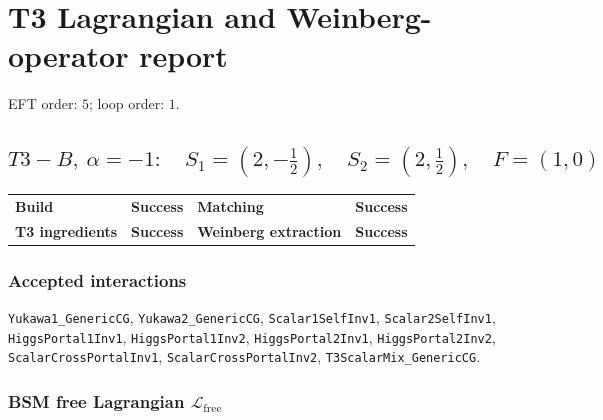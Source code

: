 \documentclass[10pt]{article}
\begin{document}
\section*{T3 Lagrangian and Weinberg-operator report}
EFT order: $5$; loop order: $1$.
\subsection*{$T3-B,\ \alpha=-1:\quad S_1=(2,-\frac{1}{2}),\quad S_2=(2,\frac{1}{2}),\quad F=(1,0)$}
\begin{center}
\begin{tabular}{>{\bfseries}l l >{\bfseries}l l}
\toprule
Build & \textbf{Success} & Matching & \textbf{Success} \\
T3 ingredients & \textbf{Success} & Weinberg extraction & \textbf{Success} \\
\bottomrule
\end{tabular}
\end{center}
\subsubsection*{Accepted interactions}
\texttt{Yukawa1\_GenericCG}, \texttt{Yukawa2\_GenericCG}, \texttt{Scalar1SelfInv1}, \texttt{Scalar2SelfInv1}, \texttt{HiggsPortal1Inv1}, \texttt{HiggsPortal1Inv2}, \texttt{HiggsPortal2Inv1}, \texttt{HiggsPortal2Inv2}, \texttt{ScalarCrossPortalInv1}, \texttt{ScalarCrossPortalInv2}, \texttt{T3ScalarMix\_GenericCG}.
\subsubsection*{BSM free Lagrangian $\mathcal{L}_{\mathrm{free}}$}
\noindent{}\par
\smallskip
\noindent{}\par
\smallskip
\noindent{}\par
\smallskip
\noindent{}\par
\smallskip
\noindent{}\par
\smallskip
\noindent{}\par
\smallskip
\end{document}
